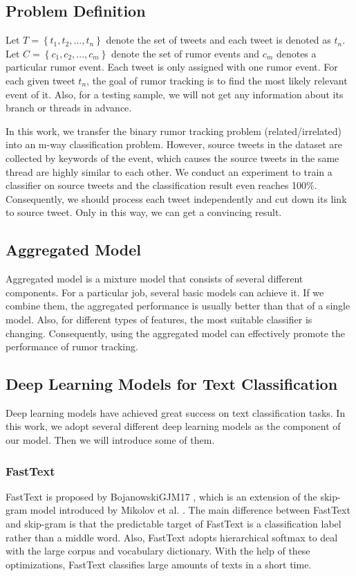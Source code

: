 \subsection{Problem Definition}
\label{sec:problem}
Let $T = \left\{t_1, t_2, ..., t_n \right\}$ denote the set of tweets and each tweet is denoted as $t_n$. Let $C = \left\{c_1, c_2, ... , c_m \right\}$ denote the set of rumor events and $c_m$ denotes a particular rumor event. Each tweet is only assigned with one rumor event. For each given tweet $t_n$, the goal of rumor tracking is to find the most likely relevant event of it. Also, for a testing sample, we will not get any information about its branch or threads in advance. 

In this work, we transfer the binary rumor tracking problem (related/irrelated) into an m-way classification problem. However, source tweets in the dataset are collected by keywords of the event, which causes the source tweets in the same thread are highly similar to each other. We conduct an experiment to train a classifier on source tweets and the classification result even reaches 100\%. Consequently, we should process each tweet independently and cut down its link to source tweet. Only in this way, we can get a convincing result.

\subsection{Aggregated Model}
\label{sec:aggregated_model}
Aggregated model is a mixture model that consists of several different components. For a particular job, several basic models can achieve it. If we combine them, the aggregated performance is usually better than that of a single model. Also, for different types of features, the most suitable classifier is changing. Consequently, using the aggregated model can effectively promote the performance of rumor tracking. 

\subsection{Deep Learning Models for Text Classification}
\label{sec:deeplearning_model} Deep learning models have achieved great success on text classification tasks. In this work, we adopt several different deep learning models as the component of our model. Then we will introduce some of them.

\subsubsection{FastText}
FastText is proposed by BojanowskiGJM17 \cite{DBLP:journals/tacl/BojanowskiGJM17}, which is an extension of the skip-gram model introduced by Mikolov et al. \cite{DBLP:conf/nips/MikolovSCCD13}. The main difference between FastText and skip-gram is that the predictable target of FastText is a classification label rather than a middle word. Also, FastText adopts hierarchical softmax to deal with the large corpus and vocabulary dictionary. With the help of these optimizations, FastText classifies large amounts of texts in a short time.

